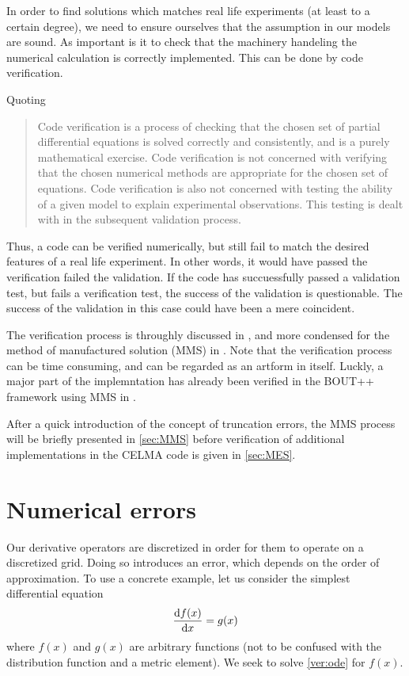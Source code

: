 In order to find solutions which matches real life experiments (at least to a certain degree), we need to ensure ourselves that the assumption in our models are sound.
As important is it to check that the machinery handeling the numerical calculation is correctly implemented.
This can be done by code verification.

Quoting \cite{Dudson2016}

\blockquote{
Code verification is a process of checking that the chosen set of partial differential equations is solved correctly and consistently, and is a purely mathematical exercise.
Code verification is not concerned with verifying that the chosen numerical methods are appropriate for the chosen set of equations.
Code verification is also not concerned with testing the ability of a given model to explain experimental observations.
This testing is dealt with in the subsequent validation process.
}

Thus, a code can be verified numerically, but still fail to match the desired features of a real life experiment.
In other words, it would have passed the verification failed the validation.
If the code has succuessfully passed a validation test, but fails a verification test, the success of the validation is questionable.
The success of the validation in this case could have been a mere coincident.

The verification process is throughly discussed in \cite{Oberkampf2010book}, and more condensed for the method of manufactured solution (MMS) in \cite{Salari}.
Note that the verification process can be time consuming, and can be regarded as an artform in itself.
Luckly, a major part of the implemntation has already been verified in the BOUT++ framework using MMS in \cite{Dudson2016}.

After a quick introduction of the concept of truncation errors, the MMS process will be briefly presented in \cref{sec:MMS} before verification of additional implementations in the CELMA code is given in \cref{sec:MES}.

\section{Numerical errors}
%
Our derivative operators are discretized in order for them to operate on a discretized grid.
Doing so introduces an error, which depends on the order of approximation.
To use a concrete example, let us consider the simplest differential equation
%
\begin{align}
    \frac{\text{d}{f(x)}}{\text{d}{x}} = g(x)
    \label{ver:ode}
\end{align}
%
where $f(x)$ and $g(x)$ are arbitrary functions (not to be confused with the distribution function and a metric element).
We seek to solve \cref{ver:ode} for $f(x)$.

